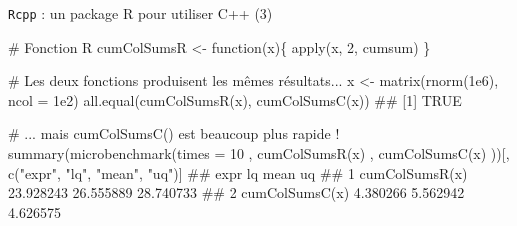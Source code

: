 \documentclass[12pt,ignorenonframetext,]{beamer}
\newenvironment{Shaded}{}{}
\newcommand{\CommentTok}[1]{\textcolor[rgb]{0.00,0.50,0.00}{#1}}
\newcommand{\ControlFlowTok}[1]{\textcolor[rgb]{0.00,0.00,1.00}{#1}}
\newcommand{\DataTypeTok}[1]{#1}
\newcommand{\DecValTok}[1]{#1}
\newcommand{\FloatTok}[1]{#1}
\newcommand{\KeywordTok}[1]{\textcolor[rgb]{0.00,0.00,1.00}{#1}}
\newcommand{\NormalTok}[1]{#1}
\newcommand{\StringTok}[1]{\textcolor[rgb]{0.00,0.50,0.50}{#1}}
\renewenvironment{Shaded}{\begin{snugshade}}{\end{snugshade}}
\begin{document}
\begin{frame}[fragile]{\texttt{Rcpp} : un package R pour utiliser C++
(3)}
\protect\hypertarget{rcpp-un-package-r-pour-utiliser-c-3}{}

\footnotesize

\begin{Shaded}
\begin{Highlighting}[]
\CommentTok{# Fonction R}
\NormalTok{cumColSumsR <-}\StringTok{ }\ControlFlowTok{function}\NormalTok{(x)\{}
  \KeywordTok{apply}\NormalTok{(x, }\DecValTok{2}\NormalTok{, cumsum)}
\NormalTok{\}}

\CommentTok{# Les deux fonctions produisent les mêmes résultats...}
\NormalTok{x <-}\StringTok{ }\KeywordTok{matrix}\NormalTok{(}\KeywordTok{rnorm}\NormalTok{(}\FloatTok{1e6}\NormalTok{), }\DataTypeTok{ncol =} \FloatTok{1e2}\NormalTok{)}
\KeywordTok{all.equal}\NormalTok{(}\KeywordTok{cumColSumsR}\NormalTok{(x), }\KeywordTok{cumColSumsC}\NormalTok{(x))}
\NormalTok{  ## [1] TRUE}

\CommentTok{# ... mais cumColSumsC() est beaucoup plus rapide !}
\KeywordTok{summary}\NormalTok{(}\KeywordTok{microbenchmark}\NormalTok{(}\DataTypeTok{times =} \DecValTok{10}
\NormalTok{  , }\KeywordTok{cumColSumsR}\NormalTok{(x)}
\NormalTok{  , }\KeywordTok{cumColSumsC}\NormalTok{(x)}
\NormalTok{))[, }\KeywordTok{c}\NormalTok{(}\StringTok{"expr"}\NormalTok{, }\StringTok{"lq"}\NormalTok{, }\StringTok{"mean"}\NormalTok{, }\StringTok{"uq"}\NormalTok{)]}
\NormalTok{  ##             expr        lq      mean        uq}
\NormalTok{  ## 1 cumColSumsR(x) 23.928243 26.555889 28.740733}
\NormalTok{  ## 2 cumColSumsC(x)  4.380266  5.562942  4.626575}
\end{Highlighting}
\end{Shaded}

\end{frame}
\end{document}
